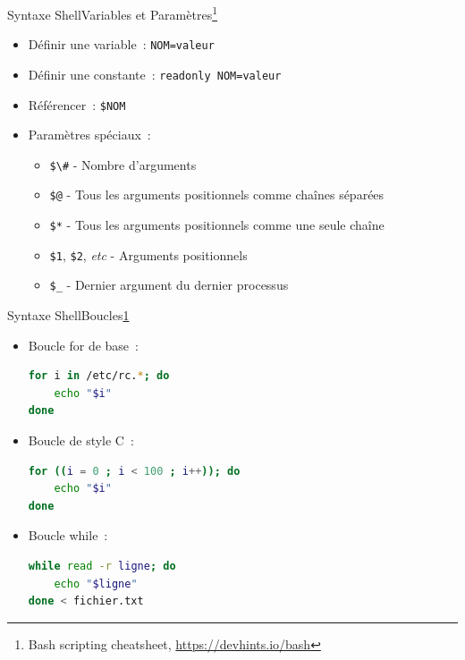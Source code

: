 \documentclass{beamer}
\begin{document}
    \begin{frame}{Syntaxe Shell}{Variables et Paramètres\footnote{\label{devhint-bash}Bash scripting cheatsheet, \url{https://devhints.io/bash}}}
        \bigbreak
        \begin{itemize}
            \item Définir une variable~: \lstinline{NOM=valeur}
            \item Définir une constante~: \lstinline{readonly NOM=valeur}
            \item Référencer~: \lstinline{$NOM}
            \item Paramètres spéciaux~:
            \begin{itemize}
                \item \lstinline{$\#} - Nombre d'arguments
                \item \lstinline{$@} - Tous les arguments positionnels comme chaînes séparées
                \item \lstinline{$*} - Tous les arguments positionnels comme une seule chaîne
                \item \lstinline{$1}, \lstinline{$2}, \textit{etc} - Arguments positionnels
                \item \lstinline{$_} - Dernier argument du dernier processus
            \end{itemize}
        \end{itemize}
    \end{frame}

    \begin{frame}[fragile]{Syntaxe Shell}{Boucles\cref{devhint-bash}}
        \begin{itemize}
            \item Boucle for de base~:
            \begin{lstlisting}[language=bash]
for i in /etc/rc.*; do
    echo "$i"
done
            \end{lstlisting}
            \item Boucle de style C~:
            \begin{lstlisting}[language=bash]
for ((i = 0 ; i < 100 ; i++)); do
    echo "$i"
done
            \end{lstlisting}
            \item Boucle while~:
            \begin{lstlisting}[language=bash]
while read -r ligne; do
    echo "$ligne"
done < fichier.txt
            \end{lstlisting}
        \end{itemize}
    \end{frame}
\end{document}
